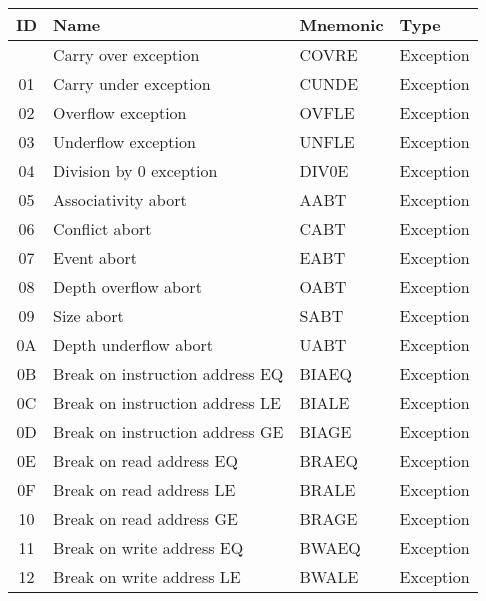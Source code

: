 \begin{table}[hbt!] %

    \begin{center}

    \begin{tabular}{|c|l|l|l|}

        \hline
        ID & Name & Mnemonic & Type \\
        \hline
        \addlinespace[10pt]
        \hline
        00 & Carry over exception & COVRE & Exception \\
        \hline
        01 & Carry under exception & CUNDE & Exception \\
        \hline
        02 & Overflow exception & OVFLE & Exception \\
        \hline
        03 & Underflow exception & UNFLE & Exception \\
        \hline
        04 & Division by 0 exception & DIV0E & Exception \\
        \hline
        05 & Associativity abort & AABT & Exception \\
        \hline
        06 & Conflict abort & CABT & Exception \\
        \hline
        07 & Event abort & EABT & Exception \\
        \hline
        08 & Depth overflow abort & OABT & Exception \\
        \hline
        09 & Size abort & SABT & Exception \\
        \hline
        0A & Depth underflow abort & UABT & Exception \\
        \hline
        0B & Break on instruction address EQ & BIAEQ & Exception \\
        \hline
        0C & Break on instruction address LE & BIALE & Exception \\
        \hline
        0D & Break on instruction address GE & BIAGE & Exception \\
        \hline
        0E & Break on read address EQ & BRAEQ & Exception \\
        \hline
        0F & Break on read address LE & BRALE & Exception \\
        \hline
        10 & Break on read address GE & BRAGE & Exception \\
        \hline
        11 & Break on write address EQ & BWAEQ & Exception \\
        \hline
        12 & Break on write address LE & BWALE & Exception \\

\end{tabular}
\end{center}
\end{table}
